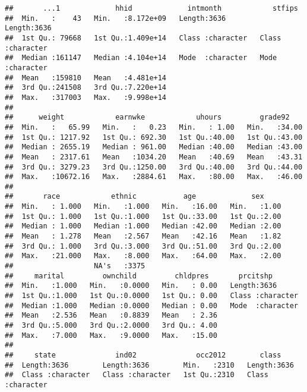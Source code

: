 \documentclass[
]{article}
\begin{document}
\begin{verbatim}
##       ...1             hhid             intmonth            stfips         
##  Min.   :    43   Min.   :8.172e+09   Length:3636        Length:3636       
##  1st Qu.: 79668   1st Qu.:1.409e+14   Class :character   Class :character  
##  Median :161147   Median :4.104e+14   Mode  :character   Mode  :character  
##  Mean   :159810   Mean   :4.481e+14                                        
##  3rd Qu.:241508   3rd Qu.:7.220e+14                                        
##  Max.   :317003   Max.   :9.998e+14                                        
##                                                                            
##      weight            earnwke            uhours         grade92     
##  Min.   :   65.99   Min.   :   0.23   Min.   : 1.00   Min.   :34.00  
##  1st Qu.: 1217.92   1st Qu.: 692.30   1st Qu.:40.00   1st Qu.:43.00  
##  Median : 2655.19   Median : 961.00   Median :40.00   Median :43.00  
##  Mean   : 2317.61   Mean   :1034.20   Mean   :40.69   Mean   :43.31  
##  3rd Qu.: 3279.23   3rd Qu.:1250.00   3rd Qu.:40.00   3rd Qu.:44.00  
##  Max.   :10672.16   Max.   :2884.61   Max.   :80.00   Max.   :46.00  
##                                                                      
##       race            ethnic           age             sex      
##  Min.   : 1.000   Min.   :1.000   Min.   :16.00   Min.   :1.00  
##  1st Qu.: 1.000   1st Qu.:1.000   1st Qu.:33.00   1st Qu.:2.00  
##  Median : 1.000   Median :1.000   Median :42.00   Median :2.00  
##  Mean   : 1.278   Mean   :2.567   Mean   :42.16   Mean   :1.82  
##  3rd Qu.: 1.000   3rd Qu.:3.000   3rd Qu.:51.00   3rd Qu.:2.00  
##  Max.   :21.000   Max.   :8.000   Max.   :64.00   Max.   :2.00  
##                   NA's   :3375                                  
##     marital         ownchild         chldpres       prcitshp        
##  Min.   :1.000   Min.   :0.0000   Min.   : 0.00   Length:3636       
##  1st Qu.:1.000   1st Qu.:0.0000   1st Qu.: 0.00   Class :character  
##  Median :1.000   Median :0.0000   Median : 0.00   Mode  :character  
##  Mean   :2.536   Mean   :0.8839   Mean   : 2.36                     
##  3rd Qu.:5.000   3rd Qu.:2.0000   3rd Qu.: 4.00                     
##  Max.   :7.000   Max.   :9.0000   Max.   :15.00                     
##                                                                     
##     state              ind02              occ2012        class          
##  Length:3636        Length:3636        Min.   :2310   Length:3636       
##  Class :character   Class :character   1st Qu.:2310   Class :character  

\end{verbatim}
\end{document}
